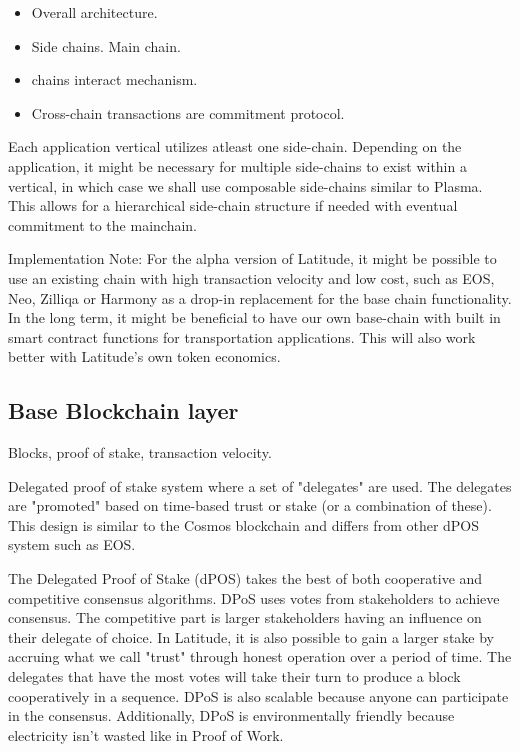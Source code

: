 \begin{itemize}
    \item Overall architecture.
    \item Side chains. Main chain.
    \item chains interact mechanism.
    \item Cross-chain transactions are commitment protocol.

\end{itemize}

Each application vertical utilizes atleast one side-chain. Depending on the application, it might be necessary for
multiple side-chains to exist within a vertical, in which case we shall use composable side-chains similar to Plasma.
This allows for a hierarchical side-chain structure if needed with eventual commitment to the mainchain.

Implementation Note: For the alpha version of Latitude, it might be possible to use an existing chain with high
transaction velocity and low cost, such as EOS, Neo, Zilliqa or Harmony as a drop-in replacement for the base chain
functionality. In the long term, it might be beneficial to have our own base-chain with built in smart contract
functions for transportation applications. This will also work better with Latitude's own token economics.

\subsection{Base Blockchain layer}

Blocks, proof of stake, transaction velocity.

Delegated proof of stake system where a set of "delegates" are used. The delegates are "promoted" based on time-based
trust or stake (or a combination of these). This design is similar to the Cosmos blockchain and differs from other dPOS
system such as EOS.

The Delegated Proof of Stake (dPOS) takes the best of both cooperative and competitive consensus algorithms. DPoS uses
votes from stakeholders to achieve consensus. The competitive part is larger stakeholders having an influence on their
delegate of choice. In Latitude, it is also possible to gain a larger stake by accruing what we call "trust" through
honest operation over a period of time. The delegates that have the most votes will take their turn to produce a block
cooperatively in a sequence. DPoS is also scalable because anyone can participate in the consensus. Additionally, DPoS
is environmentally friendly because electricity isn’t wasted like in Proof of Work.

